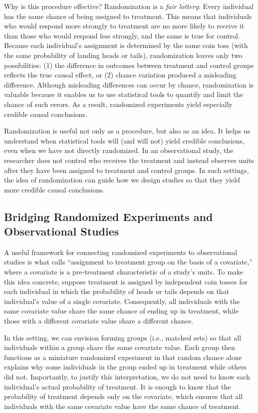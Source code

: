 \documentclass[
  12pt,
  leqno]{article}
\begin{document}
Why is this procedure effective? Randomization is a \emph{fair lottery}:
Every individual has the same chance of being assigned to treatment.
This means that individuals who would respond more strongly to treatment
are no more likely to receive it than those who would respond less
strongly, and the same is true for control. Because each individual's
assignment is determined by the same coin toss (with the same
probability of landing heads or tails), randomization leaves only two
possibilities: (1) the difference in outcomes between treatment and
control groups reflects the true causal effect, or (2) chance variation
produced a misleading difference. Although misleading differences can
occur by chance, randomization is valuable because it enables us to use
statistical tools to quantify and limit the chance of such errors. As a
result, randomized experiments yield especially credible causal
conclusions.

Randomization is useful not only as a procedure, but also as an idea. It
helps us understand when statistical tools will (and will not) yield
credible conclusions, even when we have not directly randomized. In an
observational study, the researcher does not control who receives the
treatment and instead observes units after they have been assigned to
treatment and control groups. In such settings, the idea of
randomization can guide how we design studies so that they yield more
credible causal conclusions.

\subsection{Bridging Randomized Experiments and Observational
Studies}\label{bridging-randomized-experiments-and-observational-studies}

A useful framework for connecting randomized experiments to
observational studies is what \citet{rubin1977} calls ``assignment to
treatment group on the basis of a covariate,'' where a covariate is a
pre-treatment characteristic of a study's units. To make this idea
concrete, suppose treatment is assigned by independent coin tosses for
each individual in which the probability of heads or tails depends on
that individual's value of a single covariate. Consequently, all
individuals with the same covariate value share the same chance of
ending up in treatment, while those with a different covariate value
share a different chance.

In this setting, we can envision forming groups (i.e., matched sets) so
that all individuals within a group share the same covariate value. Each
group then functions as a miniature randomized experiment in that random
chance alone explains why some individuals in the group ended up in
treatment while others did not. Importantly, to justify this
interpretation, we do not need to know each individual's actual
probability of treatment. It is enough to know that the probability of
treatment depends only on the covariate, which ensures that all
individuals with the same covariate value have the same chance of
treatment.
\end{document}
